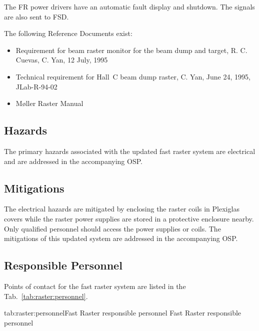 {\begin{safetyen}{0}{0}
\noindent The FR power drivers have an automatic fault display and
shutdown. The signals are also sent to FSD.

The following Reference Documents exist:
\begin{itemize}
\item{Requirement for beam raster monitor for the beam dump and target,
R. C. Cuevas, C. Yan, 12 July, 1995}
\item{Technical requirement for Hall~C beam dump raster,
C. Yan, June 24, 1995, JLab-R-94-02}

\item{M\o ller Raster Manual~\cite{docdb:moellerraster}}
\end{itemize}

\subsection{Hazards}

The primary hazards associated with the updated fast raster system
are electrical and are addressed in the accompanying OSP.

\subsection{Mitigations}

The electrical hazards are mitigated by enclosing the raster coils in
Plexiglas covers while the raster power supplies are stored in a
protective enclosure nearby. Only qualified personnel should access
the power supplies or coils. The mitigations of this updated system
are addressed in the accompanying OSP.

\subsection{Responsible Personnel}

Points of contact for the fast raster system are listed in the Tab.~\ref{tab:raster:personnel}.
\begin{namestab}{tab:raster:personnel}{Fast Raster responsible personnel}{%
          Fast Raster responsible personnel}
\end{namestab}
\end{safetyen}

}
